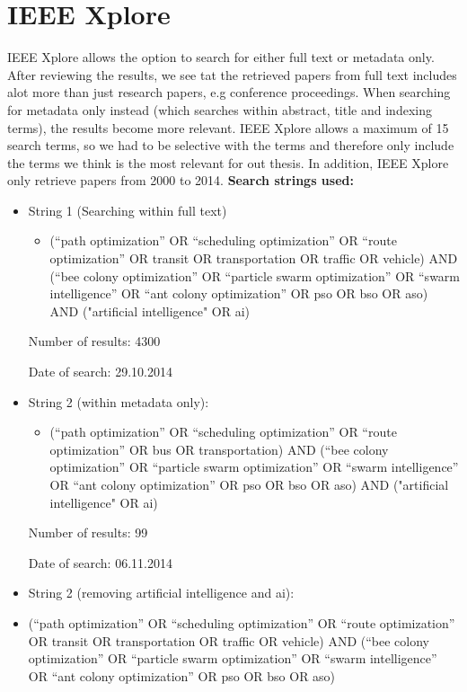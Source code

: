 \section{IEEE Xplore}
IEEE Xplore allows the option to search for either full text or metadata only. After reviewing the results, we see tat the retrieved papers from full text includes alot more than just research papers, e.g conference proceedings. When searching for metadata only instead (which searches within abstract, title and indexing terms), the results become more relevant. IEEE Xplore allows a maximum of 15 search terms, so we had to be selective with the terms and therefore only include the terms we think is the most relevant for out thesis. In addition, IEEE Xplore only retrieve papers from 2000 to 2014.
\newline
\textbf{Search strings used:}
\begin{itemize}
\item String 1 (Searching within full text)
\begin{itemize}
\item(``path optimization'' OR ``scheduling optimization'' OR ``route optimization'' OR transit OR transportation OR traffic OR vehicle) AND (``bee colony optimization'' OR ``particle swarm optimization'' OR ``swarm intelligence'' OR ``ant colony optimization'' OR pso OR bso OR aso)  AND ("artificial intelligence" OR ai)
\end{itemize}
\par Number of results: 4300
\par Date of search: 29.10.2014
\item String 2 (within metadata only):
\begin{itemize}
\item(``path optimization'' OR ``scheduling optimization'' OR ``route optimization'' OR bus OR transportation) AND (``bee colony optimization'' OR ``particle swarm optimization'' OR ``swarm intelligence'' OR ``ant colony optimization'' OR pso OR bso OR aso)  AND ("artificial intelligence" OR ai) 
\end{itemize}
\par Number of results: 99
\par Date of search: 06.11.2014
\item String 2 (removing artificial intelligence and ai):
\item(``path optimization'' OR ``scheduling optimization'' OR ``route optimization'' OR transit OR transportation OR traffic OR vehicle) AND (``bee colony optimization'' OR ``particle swarm optimization'' OR ``swarm intelligence'' OR ``ant colony optimization'' OR pso OR bso OR aso)

\end{itemize}
